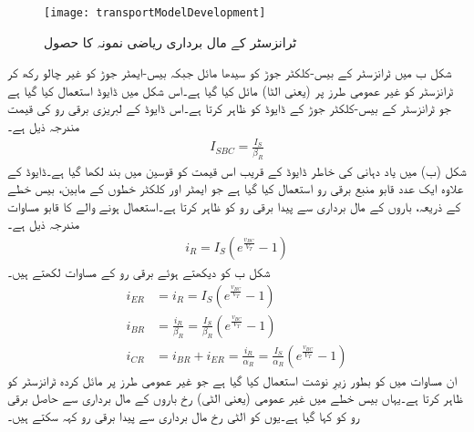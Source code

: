 \begin{figure}
\centering
\texttt{[image: transportModelDevelopment]}
\caption{ ٹرانزسٹر کے مال برداری ریاضی نمونہ  کا حصول}
\label{شکل_ٹرانزسٹر_کے_مال_برداری_ماڈل_کا_حصول}
\end{figure}
شکل  ب میں ٹرانزسٹر کے بیس-کلکٹر جوڑ کو سیدھا مائل جبکہ بیس-ایمٹر  جوڑ کو غیر چالو رکھ کر ٹرانزسٹر کو غیر عمومی طرز پر (یعنی الٹا) مائل کیا گیا ہے۔اس شکل میں ڈایوڈ  استعمال کیا گیا ہے جو ٹرانزسٹر کے بیس-کلکٹر جوڑ کے ڈایوڈ کو ظاہر کرتا ہے۔اس ڈایوڈ کے لبریزی برقی رو  کی قیمت مندرجہ ذیل ہے۔
\begin{align}
I_{SBC}=\frac{I_S}{\beta_R}
\end{align}
شکل (ب) میں یاد دہانی کی خاطر ڈایوڈ کے قریب اس قیمت کو قوسین میں بند لکھا گیا ہے۔ڈایوڈ کے علاوہ ایک عدد قابو منبع برقی رو استعمال کیا گیا ہے جو ایمٹر اور کلکٹر  خطوں کے مابین، بیس خطے کے ذریعہ، باروں کے مال برداری سے پیدا برقی رو کو ظاہر کرتا ہے۔استعمال ہونے والے   کا قابو مساوات مندرجہ ذیل ہے۔
\begin{align}
i_R=I_S \left (e^{\frac{v_{BC}}{V_T}}-1 \right )
\end{align}
شکل  ب کو دیکھتے ہوئے برقی رو کے مساوات لکھتے ہیں۔
\begin{align} \label{مساوات_ٹرانزسٹر_مال_برداری_الٹے_رو}
i_{ER}&=i_R=I_S \left (e^{\frac{v_{BC}}{V_T}}-1 \right )\\
i_{BR}&=\frac{i_R}{\beta_R}=\frac{I_S}{\beta_R} \left (e^{\frac{v_{BC}}{V_T}}-1 \right ) \\
i_{CR}&=i_{BR}+i_{ER}=\frac{i_R}{\alpha_R}=\frac{I_S}{\alpha_R} \left (e^{\frac{v_{BC}}{V_T}}-1 \right )
\end{align}
ان مساوات میں  کو بطور زیرِ نوشت استعمال کیا گیا ہے جو غیر عمومی طرز پر مائل کردہ ٹرانزسٹر کو ظاہر کرتا ہے۔یہاں بیس خطے میں غیر عمومی (یعنی الٹی) رخ باروں کے مال برداری سے حاصل برقی رو کو  کہا گیا ہے۔یوں  کو الٹی رخ مال برداری سے پیدا برقی رو کہہ سکتے ہیں۔

